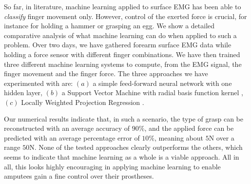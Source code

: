 So far, in literature, machine learning applied to surface EMG has
been able to \emph{classify} finger movement only.  However,
control of the exerted force is crucial, for instance for holding
a hammer or grasping an egg. We show a detailed comparative
analysis of what machine learning can do when applied to such a
problem. Over two days, we have gathered forearm surface EMG data
while holding a force sensor with different finger combinations.
We have then trained three different machine learning systems to
compute, from the EMG signal, the finger movement and the finger
force. The three approaches we have experimented with are: $(a)$ a
simple feed-forward neural network with one hidden layer, $(b)$ a
Support Vector Machine with radial basis function kernel
\cite{BGV92}, $(c)$ Locally Weighted Projection Regression
\cite{lwpr}.
%

Our numerical results indicate that, in such a scenario, the type of
grasp can be reconstructed with an average accuracy of $90\%$, and the
applied force can be predicted with an average percentage error of
$10\%$, meaning about $5$N over a range $50$N. None of the tested
approaches clearly outperforms the others, which seems to indicate
that machine learning as a whole is a viable approach. All in all,
this looks highly encouraging in applying machine learning to enable
amputees gain a fine control over their prostheses.
